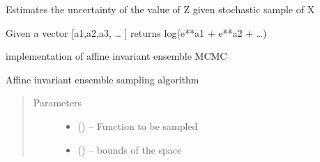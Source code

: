 \documentclass[letterpaper,10pt,english]{sphinxmanual}
\begin{document}
\begin{description}
\begin{fulllineitems}
\label{\detokenize{autogen:my_NS.get_Z_error}}
Estimates the uncertainty of the value of Z given stochastic sample of X

\end{fulllineitems}


\begin{fulllineitems}
\label{\detokenize{autogen:my_NS.logsumexp}}
Given a  vector {[}a1,a2,a3, … {]} returns log(e**a1 + e**a2 + …)

\end{fulllineitems}

\label{\detokenize{autogen:module-AIE_sampling}}
implementation of affine invariant ensemble MCMC

\begin{fulllineitems}
\label{\detokenize{autogen:AIE_sampling.AIE_sampling}}
Affine invariant ensemble sampling algorithm
\begin{quote}\begin{description}
\item[{Parameters}] \leavevmode\begin{itemize}
\item {} 
 () – Function to be sampled

\item {} 
 () – bounds of the space


\end{itemize}
\end{description}
\end{quote}
\end{fulllineitems}
\end{description}
\end{document}
